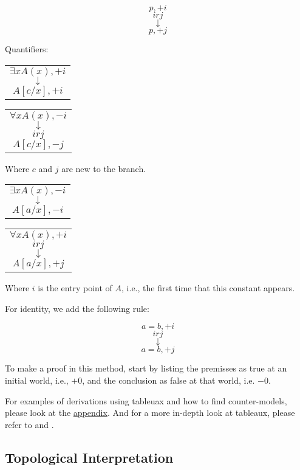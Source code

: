 \documentclass[12pt,a4paper]{article}
\theoremstyle{definition}
\begin{document}
\[ p, +i \]
\[ irj \]
\[ \downarrow \]
\[ p, +j \]

Quantifiers:

\begin{minipage}{0.4\textwidth}
\begin{tabular}{p{\textwidth}}
\[ \exists x A(x), +i \]
\[ \downarrow \]
\[ A[c/x],+i \]
\end{tabular}
\end{minipage}
\hfill
\begin{minipage}{0.4\textwidth}
\begin{tabular}{p{\textwidth}}
\[ \forall x A(x),-i \]
\[ \downarrow \]
\[ irj \]
\[ A[c/x],-j \]
\end{tabular}
\end{minipage}

Where $c$ and $j$ are new to the branch.

\begin{minipage}{0.4\textwidth}
\begin{tabular}{p{\textwidth}}
\[ \exists x A(x), -i \]
\[ \downarrow \]
\[ A[a/x],-i \]
\end{tabular}
\end{minipage}
\hfill
\begin{minipage}{0.4\textwidth}
\begin{tabular}{p{\textwidth}}
\[ \forall x A(x),+i \]
\[ irj \]
\[ \downarrow \]
\[ A[a/x],+j \]
\end{tabular}
\end{minipage}

Where $i$ is the entry point of $A$, i.e., the first time that this constant appears.


For identity, we add the following rule:

\[ a = b, +i \]
\[ irj \]
\[ \downarrow \]
\[ a=b, +j \]

To make a proof in this method, start by listing the premisses as true at an initial world, i.e., $+0$, and the conclusion as false at that world, i.e. $-0$.

For examples of derivations using tableuax and how to find counter-models, please look at the \hyperref[Examples-Tableaux]{appendix}. And for a more in-depth look at tableaux, please refer to \cite{priest2008introduction} and \cite{smullyan1995first}.

\subsection{Topological Interpretation}
\label{Topological}
\end{document}
